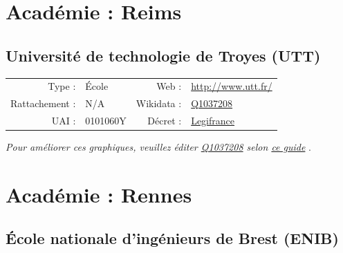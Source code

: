 \documentclass[11pt,french,landscape]{article}
\begin{document}

\newpage

\hypertarget{acaduxe9mie-reims-1}{%
\section{Académie : Reims}\label{acaduxe9mie-reims-1}}

\hypertarget{universituxe9-de-technologie-de-troyes-utt}{%
\subsection{Université de technologie de Troyes
(UTT)}\label{universituxe9-de-technologie-de-troyes-utt}}

\begin{tabular*}{0.45\textwidth}{rp{2cm}rl}  
\hline  
Type : & École & Web : &\href{http://www.utt.fr/}{http://www.utt.fr/} \\  
Rattachement : & N/A & Wikidata : & \href{https://www.wikidata.org/entity/Q1037208}{Q1037208} \\  
UAI : & 0101060Y & Décret : & \href{http://www.legifrance.gouv.fr/affichTexte.do?dateTexte=&categorieLien=id&cidTexte=JORFTEXT000000731419&fastPos=1&fastReqId=116735684&oldAction=rechExpTexteJorf}{Legifrance} \\  
\hline  
\end{tabular*}

\textit{\scriptsize Pour améliorer ces graphiques, veuillez éditer \href{https://www.wikidata.org/entity/Q1037208}{Q1037208}  selon \href{https://github.com/cpesr/wikidataESR/blob/master/Rmd/wikidataESR.md}{ce guide}}
.


\newpage

\hypertarget{acaduxe9mie-rennes-2}{%
\section{Académie : Rennes}\label{acaduxe9mie-rennes-2}}

\hypertarget{uxe9cole-nationale-dinguxe9nieurs-de-brest-enib}{%
\subsection{École nationale d'ingénieurs de Brest
(ENIB)}\label{uxe9cole-nationale-dinguxe9nieurs-de-brest-enib}}
\end{document}
